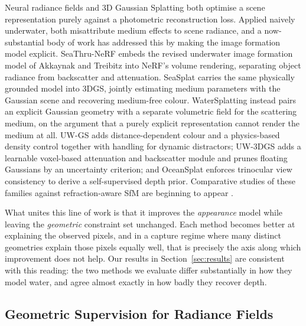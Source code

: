\documentclass[conference]{IEEEtran}
\begin{document}
Neural radiance fields \cite{mildenhall2020nerf} and 3D Gaussian Splatting
\cite{kerbl20233dgs} both optimise a scene representation purely against a
photometric reconstruction loss. Applied naively underwater, both misattribute
medium effects to scene radiance, and a now-substantial body of work has
addressed this by making the image formation model explicit. SeaThru-NeRF
\cite{levy2023seathrunerf} embeds the revised underwater image formation model
of Akkaynak and Treibitz \cite{akkaynak2018revised} into NeRF's volume
rendering, separating object radiance from backscatter and attenuation.
SeaSplat \cite{yang2025seasplat} carries the same physically grounded model
into 3DGS, jointly estimating medium parameters with the Gaussian scene and
recovering medium-free colour. WaterSplatting \cite{li2025watersplatting}
instead pairs an explicit Gaussian geometry with a separate volumetric field
for the scattering medium, on the argument that a purely explicit
representation cannot render the medium at all. UW-GS \cite{wang2025uwgs} adds
distance-dependent colour and a physics-based density control together with
handling for dynamic distractors; UW-3DGS \cite{xing2025uw3dgs} adds a
learnable voxel-based attenuation and backscatter module and prunes floating
Gaussians by an uncertainty criterion; and OceanSplat
\cite{kweon2026oceansplat} enforces trinocular view consistency to derive a
self-supervised depth prior. Comparative studies of these families against
refraction-aware SfM are beginning to appear \cite{muhammad-2025}.

What unites this line of work is that it improves the \emph{appearance} model
while leaving the \emph{geometric} constraint set unchanged. Each method
becomes better at explaining the observed pixels, and in a capture regime where
many distinct geometries explain those pixels equally well, that is precisely
the axis along which improvement does not help. Our results in
Section~\ref{sec:results} are consistent with this reading: the two methods we
evaluate differ substantially in how they model water, and agree almost exactly
in how badly they recover depth.

\subsection{Geometric Supervision for Radiance Fields}
\end{document}
